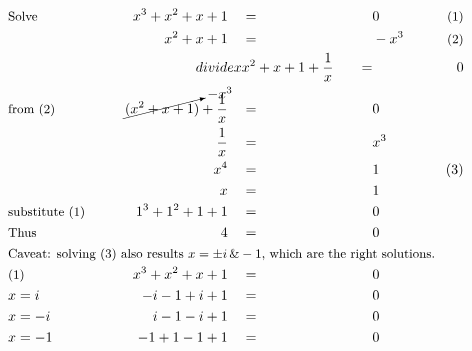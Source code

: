 \begin{alignat*}{7}
&\small{\text{Solve}}&x^3+x^2+x+1\quad&=\quad&&0&\small\text{(1)}\\
&\,&x^2+x+1\quad&=&&-x^3\qquad&\small\text{(2)}\\
&\small &divide x&x^2+x+1+\frac{1}{x}\quad&=&&0\\
&\small\text{from (2)}&\cancelto{-x^3}{(x^2+x+1)}+\frac{1}{x}\quad&=&&0\\
&\,&\frac{1}{x}\quad&=&&x^3\\
&\,&x^4\quad&=&&1&\small{(3)}\\
&\,&x\quad&=&&1\\
&\small\text{substitute (1)}\qquad&1^3+1^2+1+1\quad&=&&0\\
&\small\text{Thus}&4\quad&=&&0\\
&\rlap{\small\text{Caveat: solving (3) also results $x=\pm i\,\&-1$, which are the right solutions.}}\\
&\small\text{(1)}&x^3+x^2+x+1\quad&=\quad&&0\\
&\small x=i&-i-1+i+1\quad&=&&0\\
&\small x=-i\qquad&i-1-i+1\quad&=&&0\\
&\small x=-1&-1+1-1+1\quad&=&&0
\end{alignat*}

